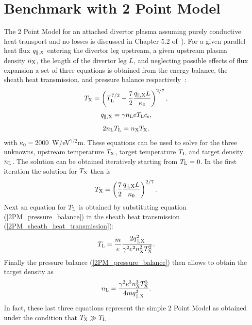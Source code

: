 \documentclass[amsmath,amssymb,a4]{revtex4-2}
\begin{document}
\section{Benchmark with 2 Point Model}
The 2 Point Model for an attached divertor plasma assuming purely conductive heat transport and no losses is discussed in Chapter 5.2 of~\cite{stangeby}). For a given parallel heat flux $q_{\parallel,\rm X}$ entering the divertor leg upstream, a given upstream plasma density $n_{\rm X}$, the length of the divertor leg $L$, and neglecting possible effects of flux expansion a set of three equations is obtained from the energy balance, the sheath heat transmission, and pressure balance respectively~\cite{stangeby}:
\begin{equation}\label{2PM_energy_balance}
    T_{\rm X} = \left(T_{\rm L}^{7/2} + {7 \over 2} {q_{\parallel,\rm X} L \over \kappa_0}\right)^{2/7},
\end{equation}
\begin{equation}\label{2PM_sheath_heat_transmission}
    q_{\parallel,\rm X} = \gamma n_{\rm L} e T_{\rm L} c_{\rm s},
\end{equation}
\begin{equation}\label{2PM_pressure_balance}
    2 n_{\rm L} T_{\rm L} = n_{\rm X} T_{\rm X}.
\end{equation}
with $\kappa_0 = 2000$~W/eV$^{7/2}$m. These equations can be used to solve for the three unknowns, upstream temperature $T_{\rm X}$, target temperature $T_{\rm L}$ and target density $n_{\rm L}$. The solution can be obtained iteratively starting from $T_{\rm L} = 0$. In the first iteration the solution for $T_{\rm X}$ then is
\begin{equation}\label{2PM_upstream_temperature}
    T_{\rm X} = \left({7 \over 2} {q_{\parallel,\rm X} L \over \kappa_0}\right)^{2/7}.
\end{equation}
Next an equation for $T_{\rm L}$ is obtained by substituting equation (\ref{2PM_pressure_balance}) in the sheath heat transmission (\ref{2PM_sheath_heat_transmission}):
\begin{equation}\label{2PM_target_temperature}
    T_{\rm L} = {m \over e} {2 q_{\parallel,\rm X}^2 \over \gamma^2 e^2 n_{\rm X}^2 T_{\rm X}^2}.
\end{equation}
Finally the pressure balance (\ref{2PM_pressure_balance}) then allows to obtain the target density as
\begin{equation}\label{2PM_target_density}
    n_{\rm L} = {\gamma^2 e^3 n_{\rm X}^3 T_{\rm X}^3 \over 4 m q_{\parallel,\rm X}^2}.
\end{equation}
In fact, these last three equations represent the simple 2 Point Model as obtained under the condition that $T_{\rm X} \gg T_{\rm L}$ \cite{stangeby}.
\end{document}
